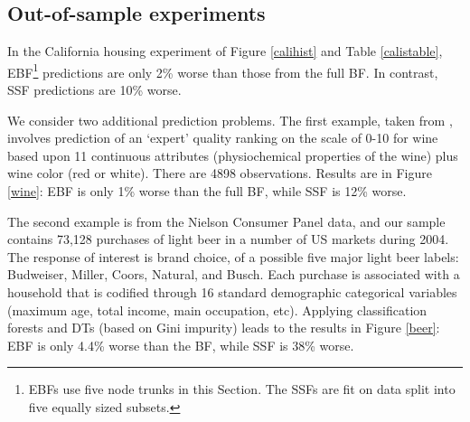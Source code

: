 \documentclass{article}
\begin{document}
\subsection{Out-of-sample experiments}\label{oos-experiment}

 
In the California housing  experiment of Figure \ref{calihist}
and Table \ref{calistable}, EBF\footnote{EBFs use five node trunks  in this Section.  The SSFs are fit on data split into five equally sized subsets.} predictions are only 2\% worse than those from the full BF.  In contrast, SSF predictions are 10\% worse.

We consider two additional prediction problems.  The first example, 
taken from \cite{CorCer09}, involves prediction of an `expert' quality ranking on
the scale of 0-10 for wine based upon 11 continuous attributes (physiochemical properties of the wine) plus
wine color (red or white).  There are 4898 observations.  Results are in Figure \ref{wine}:  EBF is only 1\% worse than the full BF, while SSF is 12\% worse.

The second example is from the Nielson Consumer Panel data,
and our sample contains 73,128 purchases of light beer in a number of US
markets  during 2004. The response of interest is brand choice, of a
possible five major light beer labels:
Budweiser, Miller, Coors, Natural, and Busch. 
Each purchase is associated with a household that is codified through
16 standard demographic categorical variables (maximum age, total income, main
occupation, etc).  Applying classification forests and DTs (based on Gini impurity) leads to the results in Figure \ref{beer}:  EBF is only 4.4\% worse than the BF, while  SSF is 38\% worse.
\end{document}

